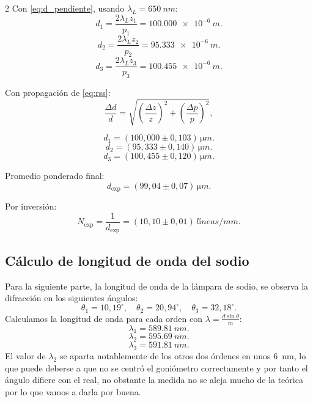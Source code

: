 \documentclass[12pt,a4paper]{article}
\begin{document}
\begin{multicols}{2}
Con \eqref{eq:d_pendiente}, usando $\lambda_L=\SI{650}{nm}$:
\begin{equation}
    d_1=\frac{2\lambda_L z_1}{p_1}=\SI{100.000e-6}{m}.
\end{equation}
\begin{equation}
    d_2=\frac{2\lambda_L z_2}{p_2}=\SI{95.333e-6}{m}.
\end{equation}
\begin{equation}
    d_3=\frac{2\lambda_L z_3}{p_3}=\SI{100.455e-6}{m}.
\end{equation}

Con propagación de \eqref{eq:rss}:
\[
\frac{\Delta d}{d}=\sqrt{\left(\frac{\Delta z}{z}\right)^2+\left(\frac{\Delta p}{p}\right)^2},
\]

\begin{equation}
    d_1=(100{,}000\pm0{,}103)\,\si{\micro m}.
\end{equation}
\begin{equation}
    d_2=(95{,}333\pm0{,}140)\,\si{\micro m}.
\end{equation}
\begin{equation}
    d_3=(100{,}455\pm0{,}120)\,\si{\micro m}.
\end{equation}

Promedio ponderado final:
\[
d_{\mathrm{exp}}=(99{,}04\pm0{,}07)\,\si{\micro m}.
\]

Por inversión:
\[
N_{\mathrm{exp}}=\frac{1}{d_{\mathrm{exp}}}
=(10{,}10\pm0{,}01)\,\si{líneas/mm}.
\]

\subsection{Cálculo de longitud de onda del sodio}

Para la siguiente parte, la longitud de onda de la lámpara de sodio, se observa la
difracción en los siguientes ángulos:
\[
\theta_1=10{,}19^\circ,\quad \theta_2=20{,}94^\circ,\quad \theta_3=32{,}18^\circ.
\]
Calculamos la longitud de onda para cada orden con $\lambda = \frac{d\sin\theta}{m}$:
\begin{equation}
    \lambda_1=\SI{589.81}{nm}.
\end{equation}
\begin{equation}
    \lambda_2=\SI{595.69}{nm}.
\end{equation}
\begin{equation}
    \lambda_3=\SI{591.81}{nm}.
\end{equation}
El valor de $\lambda_2$ se aparta notablemente de los otros dos órdenes en unos
\SI{6}{nm}, lo que puede deberse a que no se centró el goniómetro correctamente y por tanto el ángulo difiere con el real, no obstante la medida no se aleja mucho de la teórica por lo que vamos a darla por buena.


\end{multicols}
\end{document}
